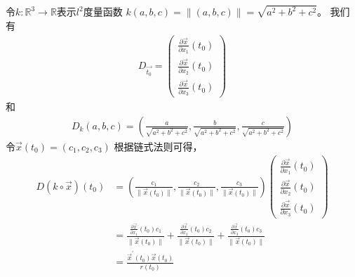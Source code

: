\documentclass{article}
\begin{document}
令$k: \mathbb{R}^3 \to \mathbb{R}$表示$l^2$度量函数
$k(a, b, c) = \|(a, b, c)\| = \sqrt{a^2 + b^2 + c^2}$。
我们有
\begin{align*}
  D_{\overrightarrow{t_0}} =
  \begin{pmatrix}
    \frac{\partial \overrightarrow{x}}{\partial x_1} (t_0) \\
    \frac{\partial \overrightarrow{x}}{\partial x_2} (t_0) \\
    \frac{\partial \overrightarrow{x}}{\partial x_3} (t_0)
  \end{pmatrix}
\end{align*}
和
\begin{align*}
  D_k(a, b, c) = (\frac{a}{\sqrt{a^2 + b^2 + c^2}}, \frac{b}{\sqrt{a^2 + b^2 + c^2}}, \frac{c}{\sqrt{a^2 + b^2 + c^2}})
\end{align*}
令$\overrightarrow{x}(t_0) = (c_1, c_2, c_3)$
根据链式法则可得，
\begin{align*}
  D(k \circ \overrightarrow{x})(t_0)
   & = (\frac{c_1}{\|\overrightarrow{x}(t_0)\|}, \frac{c_2}{\|\overrightarrow{x}(t_0)\|}, \frac{c_3}{\|\overrightarrow{x}(t_0)\|})
  \begin{pmatrix}
    \frac{\partial \overrightarrow{x}}{\partial x_1} (t_0) \\
    \frac{\partial \overrightarrow{x}}{\partial x_2} (t_0) \\
    \frac{\partial \overrightarrow{x}}{\partial x_3} (t_0)
  \end{pmatrix}                                                                       \\
   & = \frac{\frac{\partial \overrightarrow{x}}{\partial x_1} (t_0) c_1 }{\|\overrightarrow{x}(t_0)\|}
  + \frac{\frac{\partial \overrightarrow{x}}{\partial x_2} (t_0) c_2}{\|\overrightarrow{x}(t_0)\|}
  + \frac{\frac{\partial \overrightarrow{x}}{\partial x_3} (t_0) c_3}{\|\overrightarrow{x}(t_0)\|}                                 \\
   & = \frac{\overrightarrow{x}^\prime(t_0) \overrightarrow{x}(t_0)}{r(t_0)}
\end{align*}
\end{document}
